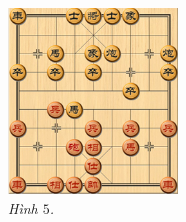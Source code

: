 \begin{multicols}{2}
	\begin{figure}[H]
		\vspace*{-5pt}
		\centering
		\captionsetup{labelformat= empty, justification=centering}
		\includegraphics[width= 0.4\textwidth]{5}
		\caption{\small\textit{\color{gocco}Hình $5$.}}
		\vspace*{-5pt}
	\end{figure}
\end{multicols}




